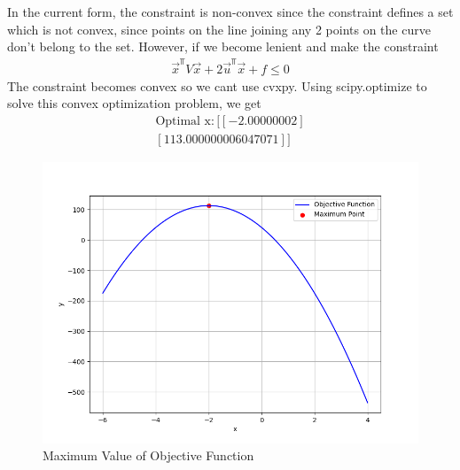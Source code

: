 \documentclass[journal]{IEEEtran}
\begin{document}
In the current form, the constraint is non-convex since the constraint defines a set which is not convex, since points on the
line joining any 2 points on the curve don't belong to the set. However, if we become lenient and make the constraint
\begin{align}
    \vec{x}^{\Top}V\vec{x} + 2\vec{u}^{\Top}\vec{x}+f\le 0
\end{align}
The constraint becomes convex so we cant use cvxpy. Using scipy.optimize to solve this convex optimization problem, we get \\
\begin{align}
    \text{Optimal x}: [[-2.00000002]\\
 [113.000000006047071]]
\end{align}
\begin{figure}[h!]
   \centering
   \includegraphics[width=1\linewidth]{figs/fig.png}
   \caption{Maximum Value of Objective Function}
   \label{stemplot}
\end{figure}
\end{document}

